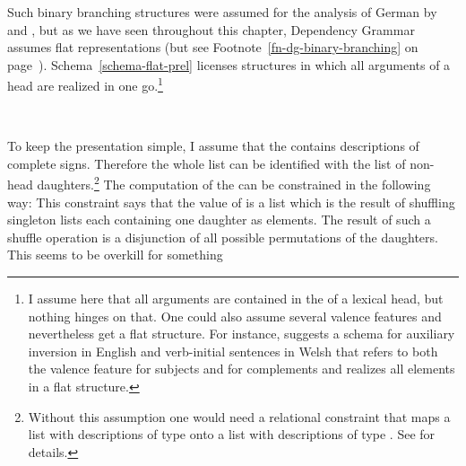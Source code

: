 Such binary branching structures were assumed for the analysis of German by \citet{Kathol95a,Kathol2000a} and
\citet{Mueller95c,Babel,Mueller99a,Mueller2002b}, but as we have seen throughout this chapter, Dependency
Grammar assumes flat representations (but see Footnote~\ref{fn-dg-binary-branching} on page~\pageref{fn-dg-binary-branching}). Schema~\ref{schema-flat-prel} licenses structures in which all arguments of a
head are realized in one go.\footnote{%
I assume here that all arguments are contained in the \subcatl of a
lexical head, but nothing hinges on that. One could also assume several valence features and
nevertheless get a flat structure. For instance, \citet[]{Borsley89} suggests a schema for auxiliary inversion in
English and verb-initial sentences in Welsh that refers to both the valence feature for subjects and for complements and realizes all
elements in a flat structure.%
}
\begin{schema}
\label{schema-flat-prel}
 \impl\\
\end{schema}
To keep the presentation simple, I assume that the \subcatl contains descriptions of complete
signs. Therefore the whole list can be identified with the list of non-head daughters.\footnote{
  Without this assumption one would need a relational constraint that maps a list with descriptions of type
   onto a list with descriptions of type . See  for details.
}
The computation of the \domv can be constrained in the following way:
\ea
{} \impl
{}
\z
This constraint says that the value of \dom is a list which is the result of shuffling singleton
lists each containing one daughter as elements. The result of such a shuffle operation is a
disjunction of all possible permutations of the daughters. This seems to be overkill for something
